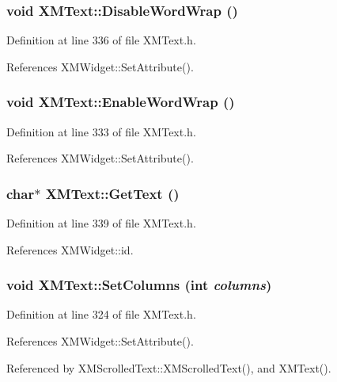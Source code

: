 \subsubsection{\setlength{\rightskip}{0pt plus 5cm}void XMText::Disable\-Word\-Wrap ()\hspace{0.3cm}{\tt  [inline]}}\label{classXMText_a8}




Definition at line 336 of file XMText.h.

References XMWidget::Set\-Attribute().
\subsubsection{\setlength{\rightskip}{0pt plus 5cm}void XMText::Enable\-Word\-Wrap ()\hspace{0.3cm}{\tt  [inline]}}\label{classXMText_a7}




Definition at line 333 of file XMText.h.

References XMWidget::Set\-Attribute().
\subsubsection{\setlength{\rightskip}{0pt plus 5cm}char$\ast$ XMText::Get\-Text ()\hspace{0.3cm}{\tt  [inline]}}\label{classXMText_a9}




Definition at line 339 of file XMText.h.

References XMWidget::id.
\subsubsection{\setlength{\rightskip}{0pt plus 5cm}void XMText::Set\-Columns (int {\em columns})\hspace{0.3cm}{\tt  [inline]}}\label{classXMText_a4}




Definition at line 324 of file XMText.h.

References XMWidget::Set\-Attribute().

Referenced by XMScrolled\-Text::XMScrolled\-Text(), and XMText().
